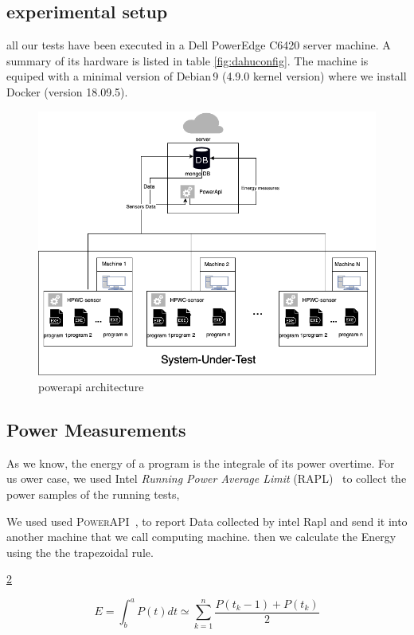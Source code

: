 \subsection{experimental setup}

all our tests have been executed in a Dell PowerEdge C6420 server machine. A summary of its hardware is listed in table \ref{fig:dahuconfig}. The machine is equiped with a minimal version of Debian\,9 (4.9.0 kernel version) where we install Docker (version 18.09.5).


\begin{figure}[hbt]
    \includegraphics[width=\linewidth]{imgs/SmartWatts.png}
    \caption{powerapi architecture}
    \label{fig:powerapi}
\end{figure}

\subsection{Power Measurements}

As we know, the energy of a program is the integrale of its power overtime. For us ower case, we used Intel \emph{Running Power Average Limit} (RAPL)~\cite{Khan:2018:RAE:3199681.3177754} to collect the power samples of the running tests,

We used used \textsc{PowerAPI}~\cite{DBLP:journals/jss/ColmantRKSFS18}, to report Data collected by intel Rapl and send it into another machine that we call computing machine. then we calculate the Energy using  the the trapezoidal rule.


\ref{fig:trapezrule}
\begin{figure}[hbt]
    \centering
    \begin{equation}
        E = \int^a_b P(t)dt \simeq \sum^n_{k=1} \frac{P(t_k-1)+P(t_k)}{2}
    \end{equation}
    \caption{}
    \label{fig:trapezrule}
\end{figure}



